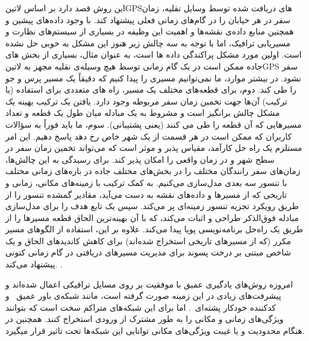 این روش قصد دارد بر اساس ‌لاتین{GPS}های دریافت شده توسط وسایل نقلیه، زمان سفر در هر خیابان را در گام‌های زمانی فعلی پیشنهاد کند.
با وجود داده‌های پیشین و همچنین منابع داده‌ی نقشه‌ها و اهمیت این وظیفه در بسیاری از سیستم‌های نظارت
و مسیریابی ترافیک، اما با توجه به سه چالش زیر هنوز این مشکل به خوبی حل نشده است.
اولین مورد مشکل پراکندگی داده ها است، به عنوان مثال، بسیاری از بخش های جاده ممکن است
در یک گام زمانی توسط هیچ وسیله‌ی نقلیه مجهز به ‌لاتین{GPS} سفر نشود.
در بیشتر موارد، ما نمی‌توانیم مسیری را پیدا کنیم که دقیقاً یک مسیر پرس و جو را طی کند.
دوم، برای قطعه‌های مختلف یک مسیر، راه های متعددی برای استفاده (یا ترکیب) آن‌ها جهت تخمین زمان سفر مربوطه وجود دارد.
یافتن یک ترکیب بهینه یک مشکل چالش برانگیز است و مشروط به یک مبادله میان طول یک قطعه
و تعداد مسیرهایی که آن قطعه را طی می کنند (یعنی پشتیبانی).
سوم، ما باید فوراً به سؤالات کاربران که ممکن است در هر قسمت از یک شهر خاص رخ دهد پاسخ دهیم.
این امر مستلزم یک راه حل کارآمد، مقیاس پذیر و موثر است که می‌تواند
تخمین زمان سفر در سطح شهر و در زمان واقعی را امکان پذیر کند.
برای رسیدگی به این چالش‌ها، زمان‌های سفر رانندگان مختلف را در بخش‌های مختلف جاده در بازه‌های زمانی مختلف
با تنسور سه بعدی مدل‌سازی می‌کنیم.
به کمک ترکیب با زمینه‌های مکانی، زمانی و تاریخی که از مسیرها و داده‌های نقشه به دست می‌آید،
مقادیر گمشده تنسور را از طریق رویکرد تجزیه تنسور زمینه‌ای پر می‌کند.
سپس یک تابع هدف را برای مدل‌سازی مبادله فوق‌الذکر طراحی و اثبات می‌کند،
که با آن بهینه‌ترین الحاق قطعه مسیرها را از طریق یک راه‌حل برنامه‌نویسی پویا پیدا می‌کند.
علاوه بر این، استفاده از الگوهای مسیر مکرر (که از مسیرهای تاریخی استخراج شده‌اند)
برای کاهش کاندیدهای الحاق و یک شاخص مبتنی بر درخت پسوند
برای مدیریت مسیرهای دریافتی در گام زمانی کنونی پیشنهاد می‌کند.
.

امروزه روش‌های یادگیری عمیق با موفقیت بر روی مسايل ترافیکی اعمال شده‌اند و پیشرفت‌های زیادی در این زمینه صورت گرفته است، مانند شبکه‌ی باور عمیق~ و کدکننده خودکار پشته‌ای~.
اما برای این شبکه‌های متراکم سخت است که بتوانند ویژگی‌های زمانی و مکانی را به طور مشترک از ورودی استخراج کنند.
همچنین در هنگام محدودیت و یا غیبت ویژگی‌های مکانی توانایی این شبکه‌ها تحت تاثیر قرار میگیرد.

